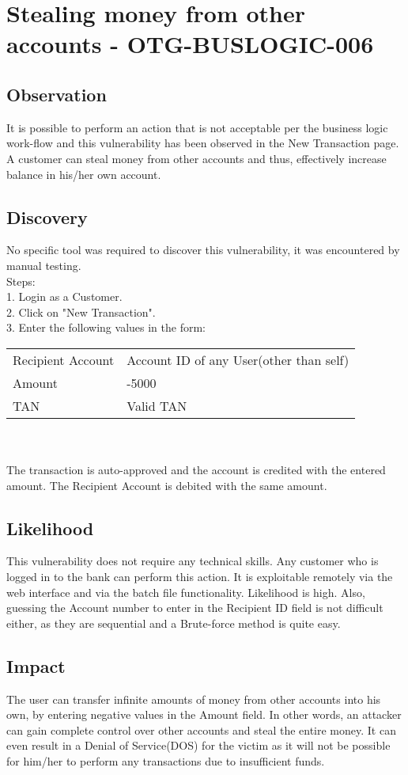 \section{Stealing money from other accounts - OTG-BUSLOGIC-006}

\subsection{Observation}
It is possible to perform an action that is not acceptable per the business logic work-flow and this vulnerability has been observed in the New Transaction page.
A customer can steal money from other accounts and thus, effectively increase balance in his/her own account.

\subsection{Discovery}
No specific tool was required to discover this vulnerability, it was encountered by manual testing.\\
Steps: \\
1. Login as a Customer. \\
2. Click on "New Transaction". \\
3. Enter the following values in the form: \\

\begin{tabular}{l | l}
Recipient Account		& Account ID of any User(other than self) \\
Amount	& -5000 \\
TAN & Valid TAN
\end{tabular}
\\
\\
The transaction is auto-approved and the account is credited with the entered amount.
The Recipient Account is debited with the same amount.

\subsection{Likelihood}
This vulnerability does not require any technical skills.  Any customer who is logged in to the bank can perform this action. It is exploitable remotely via the
web interface and via the batch file functionality.
Likelihood is high.
Also, guessing the Account number to enter in the Recipient ID field is not difficult either, as they are sequential and a Brute-force method is quite easy.

\subsection{Impact}
The user can transfer infinite amounts of money from other accounts into his own, by entering negative values in the Amount field. In other words, an attacker can gain complete control over other accounts and steal the entire money. It can even result in a Denial of Service(DOS) for the victim as it will not be possible for him/her to perform any transactions due to insufficient funds.

